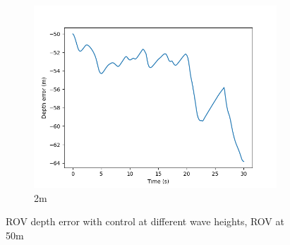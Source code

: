 \documentclass[class=article, crop=false]{standalone}
\begin{document}
\begin{figure}
\begin{subfigure}[b]{0.48\textwidth}
        \includegraphics{scenario1/rov-50m/2.0m/rov_depth_error_controlled}
        \caption{2m}
        \label{}
    \end{subfigure}

    \caption{ROV depth error with control at different wave heights, ROV at 50m}
\end{figure}
\end{document}
